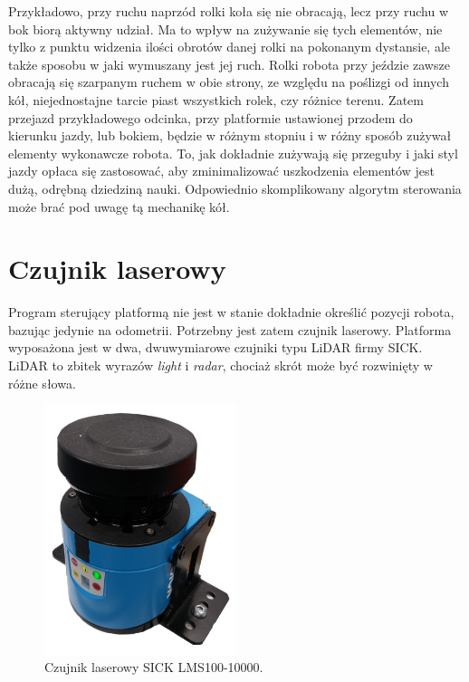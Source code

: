 	Przykładowo, przy ruchu naprzód rolki koła się nie obracają, lecz przy ruchu w bok biorą aktywny udział.
	Ma to wpływ na zużywanie się tych elementów, nie tylko z punktu widzenia ilości obrotów danej rolki na pokonanym dystansie, 
	ale także sposobu w jaki wymuszany jest jej ruch.
	Rolki robota przy jeździe zawsze obracają się szarpanym ruchem w obie strony, ze względu na poślizgi od innych kół, 
	niejednostajne tarcie piast wszystkich rolek, czy różnice terenu. 
	Zatem przejazd przykładowego odcinka, przy platformie ustawionej przodem do kierunku jazdy, lub bokiem, będzie w różnym stopniu i w różny sposób zużywał elementy wykonawcze robota.
	To, jak dokładnie zużywają się przeguby i jaki styl jazdy opłaca się zastosować, aby zminimalizować uszkodzenia elementów jest dużą, odrębną dziedziną nauki.
	Odpowiednio skomplikowany algorytm sterowania może brać pod uwagę tą mechanikę kół.

\section{Czujnik laserowy}
	\label{sec:lidar}
	Program sterujący platformą nie jest w stanie dokładnie określić pozycji robota, bazując jedynie na odometrii.
	Potrzebny jest zatem czujnik laserowy.
	Platforma wyposażona jest w dwa, dwuwymiarowe czujniki typu LiDAR firmy SICK.
	LiDAR to zbitek wyrazów \emph{light} i \emph{radar}, chociaż skrót może być rozwinięty w różne słowa.

	\begin{figure}[H]
	\centering
	\includegraphics[width=0.5\textwidth]{graphics/sensor.png}
	\caption{Czujnik laserowy SICK LMS100-10000.}
	\label{fig:sensor}
	\end{figure} 


